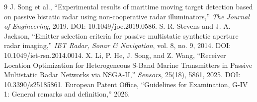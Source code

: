 \documentclass[10pt]{article}
\begin{document}
\begin{thebibliography}{9}
 J. Song et al., ``Experimental results of maritime moving target detection based on passive bistatic radar using non-cooperative radar illuminators,'' \textit{The Journal of Engineering}, 2019. DOI: 10.1049/joe.2019.0586.
 S. R. Stevens and J. A. Jackson, ``Emitter selection criteria for passive multistatic synthetic aperture radar imaging,'' \textit{IET Radar, Sonar \& Navigation}, vol. 8, no. 9, 2014. DOI: 10.1049/iet-rsn.2014.0014.
 X. Li, P. He, J. Song, and Z. Wang, ``Receiver Location Optimization for Heterogeneous S-Band Marine Transmitters in Passive Multistatic Radar Networks via NSGA-II,'' \textit{Sensors}, 25(18), 5861, 2025. DOI: 10.3390/s25185861.
 European Patent Office, ``Guidelines for Examination, G-IV 1: General remarks and definition,'' 2026.
\end{thebibliography}
\end{document}
